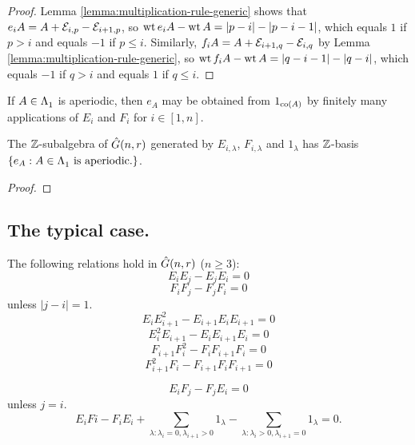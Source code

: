 \documentclass[a4paper, 11pt]{report}
\begin{document}
\begin{proof}
Lemma \ref{lemma:multiplication-rule-generic} shows that $e_iA = A+\mathcal{E}_{i,p}-\mathcal{E}_{i+1,p}$, so $\operatorname{wt}{e_iA} - \operatorname{wt}{A} = |p-i| - |p-i-1|$, which equals $1$ if $p>i$ and equals $-1$ if $p\le i$. Similarly, $f_iA = A + \mathcal{E}_{i+1,q} - \mathcal{E}_{i,q}$ by Lemma \ref{lemma:multiplication-rule-generic}, so $\operatorname{wt}{f_iA} - \operatorname{wt}{A} = |q-i-1| - |q-i|$, which equals $-1$ if $q>i$ and equals $1$ if $q\le i$.
\end{proof}

\begin{lemma}\label{lemma:factorising-aperiodic-elements}
If $A\in\Lambda_1^{}$ is aperiodic, then $e_A$ may be obtained from $1_{\operatorname{co}(A)}$ by finitely many applications of $E_i$ and $F_i$ for $i\in[1,n]$.
\end{lemma}

\begin{proposition}
The $\mathbb{Z}$-subalgebra of $\hat{G}(n,r)$ generated by $E_{i,\lambda}$, $F_{i,\lambda}$ and $1_\lambda$ has $\mathbb{Z}$-basis $\{e_A:A\in\Lambda_1^{}\text{ is aperiodic.}\}$.
\end{proposition}

\begin{proof}

\end{proof}

\subsection{The typical case.}

\begin{lemma}
The following relations hold in $\hat{G}(n,r)$ ($n\geq 3$):
\begin{equation*}
E_iE_j - E_jE_i = 0
\end{equation*}
\begin{equation*}
F_iF_j - F_jF_i = 0
\end{equation*}
unless $|j-i|=1$.
\begin{equation*}
E_iE_{i+1}^2 - E_{i+1}E_iE_{i+1} = 0
\end{equation*}
\begin{equation*}
E_i^2E_{i+1} - E_iE_{i+1}E_i = 0
\end{equation*}
\begin{equation*}
F_{i+1}F_i^2 - F_iF_{i+1}F_i = 0
\end{equation*}
\begin{equation*}
F_{i+1}^2F_i - F_{i+1}F_iF_{i+1} = 0
\end{equation*}

\begin{equation*}
E_iF_j - F_jE_i = 0
\end{equation*}
unless $j=i$.
\begin{equation*}
E_iFi - F_iE_i + \sum_{\lambda:\lambda_i = 0,\lambda_{i+1}>0} 1_\lambda - \sum_{\lambda:\lambda_i>0, \lambda_{i+1}=0} 1_\lambda = 0.
\end{equation*}
\end{lemma}
\end{document}
